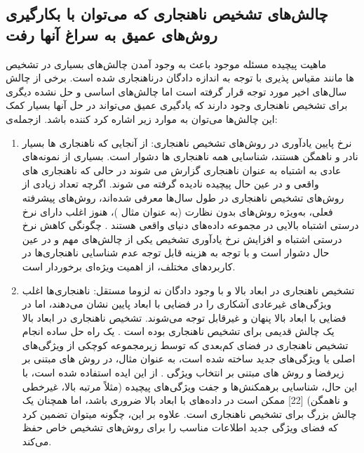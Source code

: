 \documentclass[12pt,a4paper]{report}
\begin{document}
\subsection{چالش‌های تشخیص ناهنجاری که می‌توان با بکارگیری روش‌های عمیق به سراغ آنها رفت }
ماهیت پیچیده مسئله موجود باعث به وجود آمدن چالش‌های بسیاری در تشخیص ناهنجاری شده است. برخی از چالش‌‎ها مانند مقیاس پذیری با توجه به اندازه دادگان در سال‌های اخیر مورد توجه قرار گرفته است اما چالش‌های اساسی و حل نشده دیگری برای تشخیص ناهنجاری وجود دارند که یادگیری عمیق می‌تواند در حل آنها بسیار کمک کننده باشد. ازجمله‌‌‌‌‌‌‌‌‌‌ی ‎این چالش‌ها می‌توان به موارد زیر اشاره کرد:
\begin{enumerate}
\item{
	نرخ پایین یادآوری در روش‌های تشخیص ناهنجاری:
از آنجایی که ناهنجاری ها بسیار نادر و ناهمگن هستند، شناسایی همه ناهنجاری ها دشوار است. بسیاری از نمونه‌های عادی به اشتباه به عنوان ناهنجاری گزارش می شوند در حالی که ناهنجاری های واقعی و در عین حال پیچیده نادیده گرفته می شوند. اگرچه تعداد زیادی از روش‌های تشخیص ناهنجاری در طول سال‌ها معرفی شده‌اند، روش‌های پیشرفته فعلی، به‌ویژه روش‌های بدون نظارت (به عنوان مثال \cite{Breunig2000LOFID})، هنوز اغلب دارای نرخ درستی اشتباه بالایی در مجموعه داده‌های دنیای واقعی هستند \cite{pang2019deep}. چگونگی کاهش نرخ درستی اشتباه و افزایش نرخ یادآوری تشخیص یکی از چالش‌های مهم و در عین حال دشوار است و با توجه به هزینه قابل توجه عدم شناسایی ناهنجاری‌ها در کاربرد‌های مختلف، از اهمیت ویژه‌ای برخوردار است.
}

\item {
تشخیص ناهنجاری در ابعاد بالا و با وجود دادگان نه لزوما مستقل:
ناهنجاری‌ها اغلب ویژگی‌های غیرعادی آشکاری را در فضایی با ابعاد پایین نشان می‌دهند، اما در فضایی با ابعاد بالا پنهان و غیرقابل توجه می‌شوند. تشخیص ناهنجاری در ابعاد بالا یک چالش قدیمی برای تشخیص ناهنجاری بوده است . یک راه حل ساده انجام تشخیص ناهنجاری در فضای کم‌بعدی که توسط زیرمجموعه کوچکی از ویژگی‌های اصلی یا ویژگی‌های جدید ساخته شده است، به عنوان مثال، در روش های مبتنی بر زیرفضا \cite{?, ?, ?, ?} و روش های مبتنی بر انتخاب ویژگی \cite{?,?,?,?}. از این ایده استفاده شده است، با این حال، شناسایی برهمکنش‌ها و جفت‌ ویژگی‌های پیچیده (مثلاً مرتبه بالا، غیرخطی و ناهمگن) [22] ممکن است در داده‌های با ابعاد بالا ضروری باشد، اما همچنان یک چالش بزرگ برای تشخیص ناهنجاری است. علاوه بر این، چگونه میتوان تضمین کرد که فضای ویژگی جدید اطلاعات مناسب را برای روش‌های تشخیص خاص حفظ می‌کند.
}


\end{enumerate}
\end{document}
